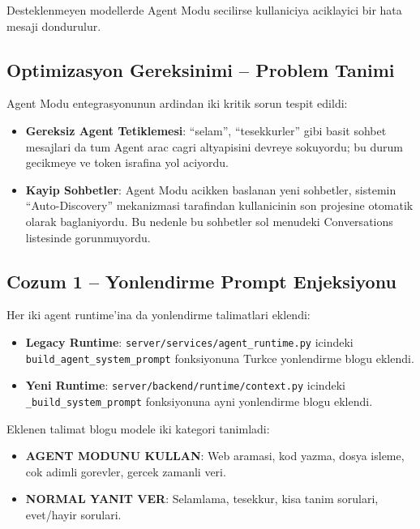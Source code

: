 \documentclass[11pt,a4paper]{article}
\begin{document}
{Desteklenmeyen modellerde Agent Modu secilirse kullaniciya aciklayici bir hata mesaji dondurulur.

\subsection{Optimizasyon Gereksinimi -- Problem Tanimi}

Agent Modu entegrasyonunun ardindan iki kritik sorun tespit edildi:
\begin{itemize}[leftmargin=1.5em]
    \item \textbf{Gereksiz Agent Tetiklemesi}: ``selam'', ``tesekkurler'' gibi basit sohbet mesajlari da tum Agent arac cagri altyapisini devreye sokuyordu; bu durum gecikmeye ve token israfina yol aciyordu.
    \item \textbf{Kayip Sohbetler}: Agent Modu acikken baslanan yeni sohbetler, sistemin ``Auto-Discovery'' mekanizmasi tarafindan kullanicinin son projesine otomatik olarak baglaniyordu. Bu nedenle bu sohbetler sol menudeki Conversations listesinde gorunmuyordu.
\end{itemize}

\subsection{Cozum 1 -- Yonlendirme Prompt Enjeksiyonu}

Her iki agent runtime'ina da yonlendirme talimatlari eklendi:
\begin{itemize}[leftmargin=1.5em]
    \item \textbf{Legacy Runtime}: \texttt{server/services/agent\_runtime.py} icindeki \texttt{build\_agent\_system\_prompt} fonksiyonuna Turkce yonlendirme blogu eklendi.
    \item \textbf{Yeni Runtime}: \texttt{server/backend/runtime/context.py} icindeki \texttt{\_build\_system\_prompt} fonksiyonuna ayni yonlendirme blogu eklendi.
\end{itemize}

Eklenen talimat blogu modele iki kategori tanimladi:
\begin{itemize}[leftmargin=1.5em]
    \item \textbf{AGENT MODUNU KULLAN}: Web aramasi, kod yazma, dosya isleme, cok adimli gorevler, gercek zamanli veri.
    \item \textbf{NORMAL YANIT VER}: Selamlama, tesekkur, kisa tanim sorulari, evet/hayir sorulari.
\end{itemize}

}
\end{document}
